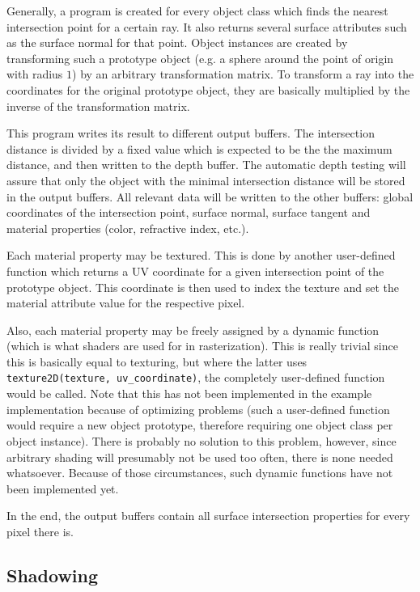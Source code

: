 \documentclass[english,fleqn,10pt,twocolumn]{article}
\begin{document}
Generally, a program is created for every object class which finds the nearest intersection point for a certain ray. It also returns several surface attributes such as the surface normal for that point. Object instances are created by
transforming such a prototype object (e.g. a sphere around the point of origin with radius $1$) by an arbitrary transformation matrix. To transform a ray into the coordinates for the original prototype object, they are basically
multiplied by the inverse of the transformation matrix.

This program writes its result to different output buffers. The intersection distance is divided by a fixed value which is expected to be the the maximum distance, and then written to the depth buffer. The automatic depth testing will
assure that only the object with the minimal intersection distance will be stored in the output buffers. All relevant data will be written to the other buffers: global coordinates of the intersection point, surface normal, surface
tangent and material properties (color, refractive index, etc.).

Each material property may be textured. This is done by another user-defined function which returns a UV coordinate for a given intersection point of the prototype object. This coordinate is then used to index the texture and set the
material attribute value for the respective pixel.

Also, each material property may be freely assigned by a dynamic function (which is what shaders are used for in rasterization). This is really trivial since this is basically equal to texturing, but where the latter uses
{\tt texture2D(texture, uv\_coordinate)}, the completely user-defined function would be called. Note that this has not been implemented in the example implementation because of optimizing problems (such a user-defined function
would require a new object prototype, therefore requiring one object class per object instance). There is probably no solution to this problem, however, since arbitrary shading will presumably not be used too often, there is
none needed whatsoever. Because of those circumstances, such dynamic functions have not been implemented yet.

In the end, the output buffers contain all surface intersection properties for every pixel there is.

\subsection{Shadowing}
\end{document}
